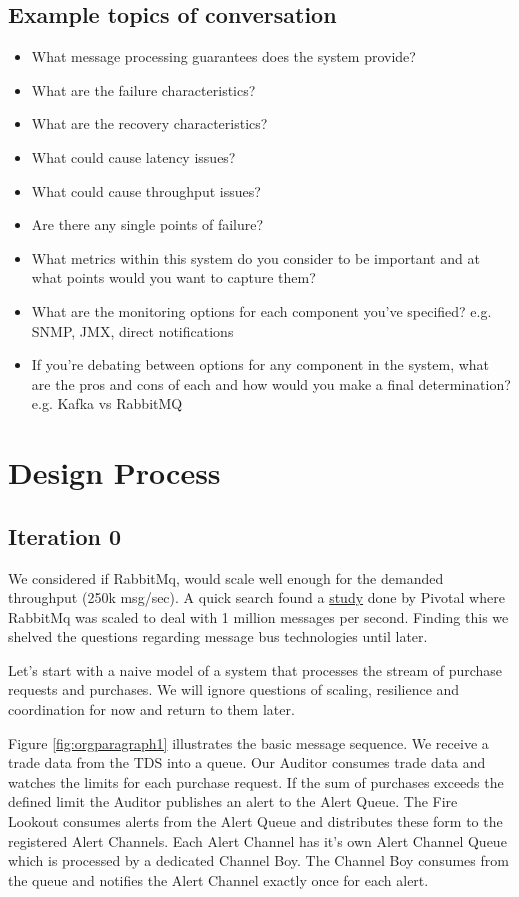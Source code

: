 \documentclass[captions=tableheading]{scrreprt}
\begin{document}
\section{Example topics of conversation}
\label{sec:orgheadline7}
\begin{itemize}
\item What message processing guarantees does the system provide?
\item What are the failure characteristics?
\item What are the recovery characteristics?
\item What could cause latency issues?
\item What could cause throughput issues?
\item Are there any single points of failure?
\item What metrics within this system do you consider to be important and
at what points would you want to capture them?
\item What are the monitoring options for each component you’ve specified?
e.g. SNMP, JMX, direct notifications
\item If you’re debating between options for any component in the system,
what are the pros and cons of each and how would you make a final
determination? e.g. Kafka vs RabbitMQ
\end{itemize}


\chapter{Design Process}
\label{sec:orgheadline22}
\section{Iteration 0}
\label{sec:orgheadline11}
We considered if RabbitMq, would scale well
enough for the demanded throughput (250k msg/sec).
A quick search found a \href{http://blog.pivotal.io/pivotal/products/rabbitmq-hits-one-million-messages-per-second-on-google-compute-engine}{study} done by Pivotal where RabbitMq was
scaled to deal with 1 million messages per second. Finding this we
shelved the questions regarding message bus technologies until later.

Let’s start with a naive model of a system that processes the
stream of purchase requests and purchases. We will ignore questions of scaling,
resilience and coordination for now and return to them later.

Figure \ref{fig:orgparagraph1} illustrates the basic message sequence. We
receive a trade data from the TDS into a queue. Our Auditor consumes
trade data and watches the limits for each purchase request. If the
sum of purchases exceeds the defined limit the Auditor publishes an
alert to the Alert Queue. The Fire Lookout consumes alerts from the
Alert Queue and distributes these form to the registered Alert
Channels. Each Alert Channel has it's own Alert Channel Queue which is
processed by a dedicated Channel Boy. The Channel Boy consumes from
the queue and notifies the Alert Channel exactly once for each alert.
\end{document}
